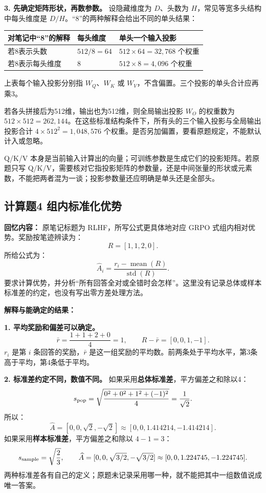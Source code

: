 \documentclass[UTF8,a4paper,zihao=-4,fontset=windows]{ctexart}
\newcommand{\recalled}[1]{\Needspace{8\baselineskip}\subsection*{#1}}
\begin{document}
\textbf{3. 先确定矩阵形状，再数参数。}
设隐藏维度为 $D$、头数为 $H$，常见等宽多头结构中每头维度是 $D/H$。“8”的两种解释会给出不同的单头结果：
\begin{center}
\begin{tabularx}{\linewidth}{|X|p{30mm}|p{40mm}|}\hline
\textbf{对笔记中“8”的解释} & \textbf{每头维度} & \textbf{单头一个输入投影}\\\hline
若8表示头数 & $512/8=64$ & $512\times64=32,768$ 个权重\\\hline
若8表示每头维度 & 8 & $512\times8=4,096$ 个权重\\\hline
\end{tabularx}
\end{center}
上表每个输入投影分别指 $W_Q$、$W_K$ 或 $W_V$，不含偏置。三个投影的单头合计应再乘3。

若各头拼接后为512维，输出也为512维，则全局输出投影 $W_O$ 的权重数为 $512\times512=262,144$。在这些标准结构条件下，所有头的三个输入投影与全局输出投影合计 $4\times512^2=1,048,576$ 个权重。是否另加偏置，要看原题规定，不能默认计入或忽略。

Q/K/V 本身是当前输入计算出的向量；可训练参数是生成它们的投影矩阵。若原题只写 Q/K/V，需要核对它指投影矩阵的参数量，还是中间张量的形状或元素数，不能把两者混为一谈；投影参数量还应明确是单头还是全部头。

\recalled{计算题4 组内标准化优势}

\textbf{回忆内容：}
原笔记标题为 RLHF，所写公式更具体地对应 GRPO 式组内相对优势。奖励按笔迹辨读为：
\[
R=[1,1,2,0].
\]
所给公式为：
\[
\widehat A_i=\frac{r_i-\operatorname{mean}(R)}{\operatorname{std}(R)}.
\]
要求计算优势，并分析“所有回答全对或全错时会怎样”。这里没有记录总体或样本标准差的约定，也没有写出零方差处理方法。

\textbf{解释与能确定的结果：}

\textbf{1. 平均奖励和偏差可以确定。}
\[
\bar r=\frac{1+1+2+0}{4}=1,\qquad
R-\bar r=[0,0,1,-1].
\]
$r_i$ 是第 $i$ 条回答的奖励，$\bar r$ 是这一组奖励的平均数。前两条处于平均水平，第3条高于平均，第4条低于平均。

\textbf{2. 标准差约定不同，数值不同。}
如果采用\textbf{总体标准差}，平方偏差之和除以4：
\[
s_{\rm pop}=\sqrt{\frac{0^2+0^2+1^2+(-1)^2}{4}}
=\frac1{\sqrt2}.
\]
所以：
\[
\widehat A=[0,0,\sqrt2,-\sqrt2]
\approx[0,0,1.414214,-1.414214].
\]
如果采用\textbf{样本标准差}，平方偏差之和除以 $4-1=3$：
\[
s_{\rm sample}=\sqrt{\frac23},\qquad
\widehat A=[0,0,\sqrt{3/2},-\sqrt{3/2}]
\approx[0,0,1.224745,-1.224745].
\]
两种标准差各有自己的定义；原题未记录采用哪一种，就不能把其中一组数值说成唯一答案。
\end{document}
